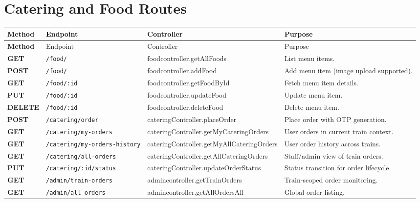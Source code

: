 \documentclass[12pt,a4paper]{report}
\renewcommand{\toprule}{\hline\hline}
\renewcommand{\midrule}{\hline}
\renewcommand{\bottomrule}{\hline\hline}
\begin{document}
\section{Catering and Food Routes}
\begin{longtable}{>{\bfseries}p{} p{} p{} p{}}
\toprule
\rowcolor{TableHeader}
\textcolor{TableHeaderText}{Method} & \textcolor{TableHeaderText}{Endpoint} & \textcolor{TableHeaderText}{Controller} & \textcolor{TableHeaderText}{Purpose} \\
\midrule
\endfirsthead
\toprule
\rowcolor{TableHeader}
\textcolor{TableHeaderText}{Method} & \textcolor{TableHeaderText}{Endpoint} & \textcolor{TableHeaderText}{Controller} & \textcolor{TableHeaderText}{Purpose} \\
\midrule
\endhead
GET & \texttt{/food/} & foodcontroller.getAllFoods & List menu items. \\
POST & \texttt{/food/} & foodcontroller.addFood & Add menu item (image upload supported). \\
GET & \texttt{/food/:id} & foodcontroller.getFoodById & Fetch menu item details. \\
PUT & \texttt{/food/:id} & foodcontroller.updateFood & Update menu item. \\
DELETE & \texttt{/food/:id} & foodcontroller.deleteFood & Delete menu item. \\
POST & \texttt{/catering/order} & cateringController.placeOrder & Place order with OTP generation. \\
GET & \texttt{/catering/my-orders} & cateringController.getMyCateringOrders & User orders in current train context. \\
GET & \texttt{/catering/my-orders-history} & cateringController.getMyAllCateringOrders & User order history across trains. \\
GET & \texttt{/catering/all-orders} & cateringController.getAllCateringOrders & Staff/admin view of train orders. \\
PUT & \texttt{/catering/:id/status} & cateringController.updateOrderStatus & Status transition for order lifecycle. \\
GET & \texttt{/admin/train-orders} & admincontroller.getTrainOrders & Train-scoped order monitoring. \\
GET & \texttt{/admin/all-orders} & admincontroller.getAllOrdersAll & Global order listing. \\
\bottomrule
\end{longtable}
\end{document}
